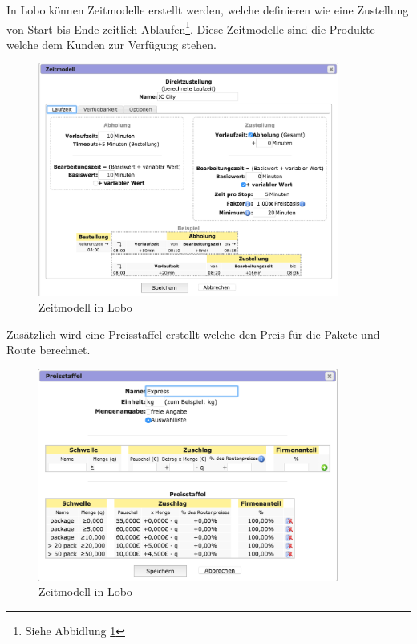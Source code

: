 In Lobo können Zeitmodelle erstellt werden, welche definieren wie eine Zustellung von Start bis Ende zeitlich Ablaufen\footnote{Siehe Abbidlung \ref{fig1:lobozeitmodell}}. Diese Zeitmodelle sind die Produkte welche dem Kunden zur Verfügung stehen.
\begin{figure}[ht]
	\centering
  \includegraphics[width=0.88\textwidth]{images/loboZeitmodell.png}
	\caption{Zeitmodell in Lobo}
	\label{fig1:lobozeitmodell}
\end{figure}

Zusätzlich wird eine Preisstaffel erstellt welche den Preis für die Pakete und Route berechnet.

\begin{figure}[ht]
	\centering
  \includegraphics[width=0.88\textwidth]{images/loboPreisstaffel.png}
	\caption{Zeitmodell in Lobo}
	\label{fig1:lobopreisstaffel}
\end{figure}


